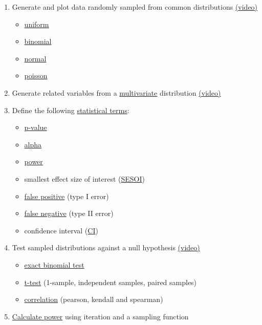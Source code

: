 \documentclass[
  oneside]{book}
\providecommand{\tightlist}{%
  \setlength{\itemsep}{0pt}\setlength{\parskip}{0pt}}
\begin{document}
\begin{enumerate}
\def\labelenumi{\arabic{enumi}.}
\tightlist
\item
  Generate and plot data randomly sampled from common distributions \href{https://youtu.be/iuecrT3q1kg}{(video)}

  \begin{itemize}
  \tightlist
  \item
    \protect\hyperlink{uniform}{uniform}
  \item
    \protect\hyperlink{binomial}{binomial}
  \item
    \protect\hyperlink{normal}{normal}
  \item
    \protect\hyperlink{poisson}{poisson}
  \end{itemize}
\item
  Generate related variables from a \protect\hyperlink{mvdist}{multivariate} distribution \href{https://youtu.be/B14HfWQ1kIc}{(video)}
\item
  Define the following \protect\hyperlink{stat-terms}{statistical terms}:

  \begin{itemize}
  \tightlist
  \item
    \protect\hyperlink{p-value}{p-value}
  \item
    \protect\hyperlink{alpha}{alpha}
  \item
    \protect\hyperlink{power}{power}
  \item
    smallest effect size of interest (\protect\hyperlink{sesoi}{SESOI})
  \item
    \protect\hyperlink{false-pos}{false positive} (type I error)
  \item
    \protect\hyperlink{false-neg}{false negative} (type II error)
  \item
    confidence interval (\protect\hyperlink{conf-inf}{CI})
  \end{itemize}
\item
  Test sampled distributions against a null hypothesis \href{https://youtu.be/Am3G6rA2S1s}{(video)}

  \begin{itemize}
  \tightlist
  \item
    \protect\hyperlink{exact-binom}{exact binomial test}
  \item
    \protect\hyperlink{t-test}{t-test} (1-sample, independent samples, paired samples)
  \item
    \protect\hyperlink{correlation}{correlation} (pearson, kendall and spearman)
  \end{itemize}
\item
  \protect\hyperlink{calc-power-binom}{Calculate power} using iteration and a sampling function
\end{enumerate}
\end{document}
